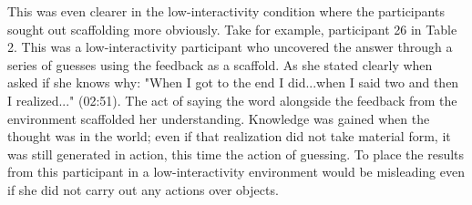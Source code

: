 {{This was even clearer in the low-interactivity condition where the participants sought out scaffolding more obviously. Take for example, participant 26 in Table 2. This was a low-interactivity participant who uncovered the answer through a series of guesses using the feedback as a scaffold. As she stated clearly when asked if she knows why: "When I got to the end I did...when I said two and then I realized..." (02:51). The act of saying the word alongside the feedback from the environment scaffolded her understanding. Knowledge was gained when the thought was in the world; even if that realization did not take material form, it was still generated in action, this time the action of guessing. To place the results from this participant in a low-interactivity environment would be misleading even if she did not carry out any actions over objects.

}}
